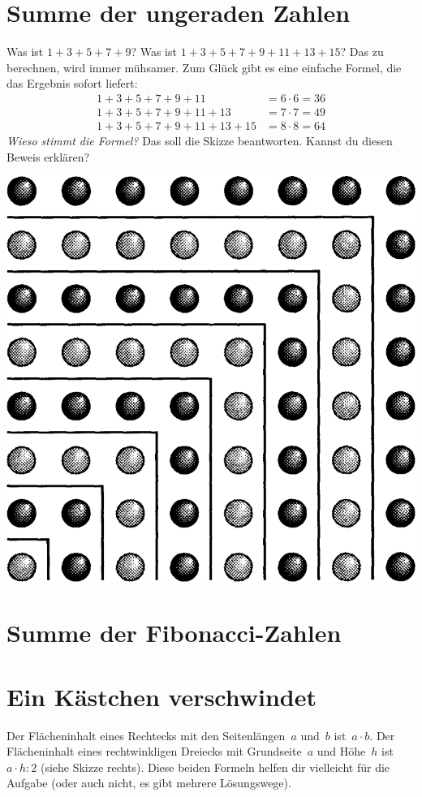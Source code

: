 \documentclass{../zirkelblatt}
\begin{document}
\section*{Summe der ungeraden Zahlen}
Was ist $1 + 3 + 5 + 7 + 9$? Was ist $1 + 3 + 5 + 7 + 9 + 11 + 13 + 15$? Das zu
berechnen, wird immer mühsamer. Zum Glück gibt es eine einfache Formel, die das
Ergebnis sofort liefert:
\begin{align*}
  1 + 3 + 5 + 7 + 9 + 11 \phantom{{} + 13 + 15} &= 6 \cdot 6 = 36 \\
  1 + 3 + 5 + 7 + 9 + 11 + 13 \phantom{{} + 15} &= 7 \cdot 7 = 49 \\
  1 + 3 + 5 + 7 + 9 + 11 + 13 + 15 &= 8 \cdot 8 = 64
\end{align*}
\emph{Wieso stimmt die Formel?} Das soll die Skizze beantworten. Kannst du
diesen Beweis erklären?
\begin{center}
\includegraphics[scale=0.4]{summe-ungerade-zahlen}
\end{center}


\vfill
\section*{Summe der Fibonacci-Zahlen}


\vfill
\newpage
\section*{Ein Kästchen verschwindet}
\begin{floatingfigure}[r]{3.5cm}
  \vspace{-0.3cm}
  \scalebox{0.4}{}
\end{floatingfigure}
Der Flächeninhalt eines Rechtecks mit den Seitenlängen~$a$ und~$b$ ist~$a \cdot
b$. Der Flächeninhalt eines rechtwinkligen Dreiecks mit Grundseite~$a$ und
Höhe~$h$ ist~$a \cdot h : 2$ (siehe Skizze rechts). Diese beiden Formeln helfen
dir vielleicht für die Aufgabe (oder auch nicht, es gibt mehrere Lösungswege).
\end{document}
